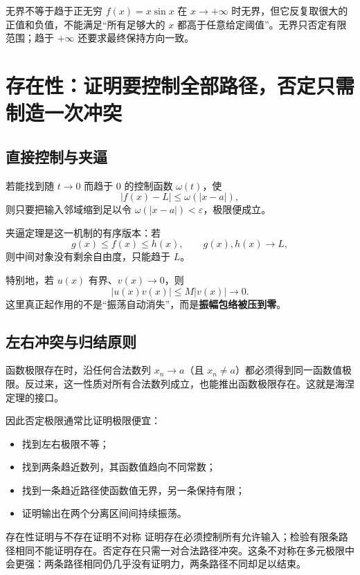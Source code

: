 \documentclass[11pt,a4paper]{ctexart}
\newcommand{\kw}[1]{\textbf{\color{deep}#1}}
\begin{document}
\begin{warnbox}{无界不等于趋于正无穷}
$f(x)=x\sin x$ 在 $x\to+\infty$ 时无界，但它反复取很大的正值和负值，不能满足“所有足够大的 $x$ 都高于任意给定阈值”。无界只否定有限范围；趋于 $+\infty$ 还要求最终保持方向一致。
\end{warnbox}

\section{存在性：证明要控制全部路径，否定只需制造一次冲突}

\subsection{直接控制与夹逼}

若能找到随 $t\to0$ 而趋于 $0$ 的控制函数 $\omega(t)$，使
\[
|f(x)-L|\le \omega(|x-a|),
\]
则只要把输入邻域缩到足以令 $\omega(|x-a|)<\varepsilon$，极限便成立。

夹逼定理是这一机制的有序版本：若
\[
g(x)\le f(x)\le h(x),\qquad g(x),h(x)\to L,
\]
则中间对象没有剩余自由度，只能趋于 $L$。

特别地，若 $u(x)$ 有界、$v(x)\to0$，则
\[
|u(x)v(x)|\le M|v(x)|\to0.
\]
这里真正起作用的不是“振荡自动消失”，而是\kw{振幅包络被压到零}。

\subsection{左右冲突与归结原则}

函数极限存在时，沿任何合法数列 $x_n\to a$（且 $x_n\ne a$）都必须得到同一函数值极限。反过来，这一性质对所有合法数列成立，也能推出函数极限存在。这就是海涅定理的接口。

因此否定极限通常比证明极限便宜：
\begin{itemize}
  \item 找到左右极限不等；
  \item 找到两条趋近数列，其函数值趋向不同常数；
  \item 找到一条趋近路径使函数值无界，另一条保持有限；
  \item 证明输出在两个分离区间间持续振荡。
\end{itemize}

\begin{corebox}{存在性证明与不存在证明不对称}
证明存在必须控制所有允许输入；检验有限条路径相同不能证明存在。否定存在只需一对合法路径冲突。这条不对称在多元极限中会更强：两条路径相同仍几乎没有证明力，两条路径不同却足以结束。
\end{corebox}
\end{document}
